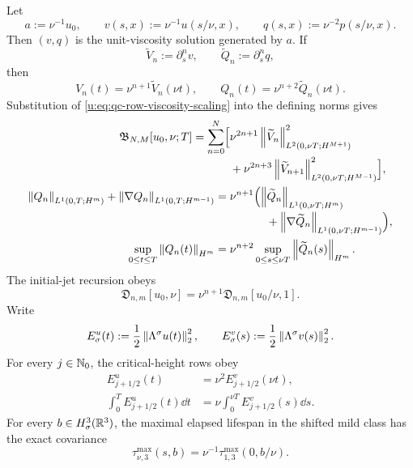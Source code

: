 \begin{proposition}
\label{u:prop:qc-exact-viscosity-scaling}
Let
\[
 a:=\nu^{-1}u_0,
 \qquad
 v(s,x):=\nu^{-1}u(s/\nu,x),
 \qquad
 q(s,x):=\nu^{-2}p(s/\nu,x).
\]
Then \((v,q)\) is the unit-viscosity solution generated by \(a\).  If
\[
 \widetilde V_n:=\partial_s^nv,
 \qquad
 \widetilde Q_n:=\partial_s^nq,
\]
then
\begin{equation}
 V_n(t)=\nu^{n+1}\widetilde V_n(\nu t),
 \qquad
 Q_n(t)=\nu^{n+2}\widetilde Q_n(\nu t).
 \label{u:eq:qc-row-viscosity-scaling}
\end{equation}
Substitution of \eqref{u:eq:qc-row-viscosity-scaling} into the defining norms gives
\begin{align}
 \mathfrak B_{N,M}[u_0,\nu;T]
 =\sum_{n=0}^{N}\Bigl[{}
 &\nu^{2n+1}
 \left\lVert \widetilde V_n\right\rVert_{L^2(0,\nu T;H^{M+1})}^2
 \notag\\[-2pt]
 &+\nu^{2n+3}
 \left\lVert \widetilde V_{n+1}\right\rVert_{L^2(0,\nu T;H^{M-1})}^2
 \Bigr],
 \label{u:eq:qc-rectangle-viscosity-scaling}\\
 \left\lVert Q_n\right\rVert_{L^1(0,T;H^m)}
 +\left\lVert \nabla Q_n\right\rVert_{L^1(0,T;H^{m-1})}
 ={}&\nu^{n+1}\Bigl(
 \left\lVert \widetilde Q_n\right\rVert_{L^1(0,\nu T;H^m)}
 \notag\\[-2pt]
 &\hspace{32pt}+
 \left\lVert \nabla\widetilde Q_n\right\rVert_{L^1(0,\nu T;H^{m-1})}
 \Bigr),
 \label{u:eq:qc-pressure-viscosity-scaling}\\
 \sup_{0\le t\le T}\left\lVert Q_n(t)\right\rVert_{H^m}
 ={}&\nu^{n+2}
 \sup_{0\le s\le\nu T}\left\lVert \widetilde Q_n(s)\right\rVert_{H^m}.
 \label{u:eq:qc-pressure-sup-viscosity-scaling}
\end{align}
The initial-jet recursion obeys
\begin{equation}
 \mathfrak D_{n,m}[u_0,\nu]
 =\nu^{n+1}\mathfrak D_{n,m}[u_0/\nu,1].
 \label{u:eq:qc-initial-jet-viscosity-scaling}
\end{equation}
Write
\[
 E_\sigma^u(t):=\frac12\left\lVert \Lambda^\sigma u(t)\right\rVert_2^2,
 \qquad
 E_\sigma^v(s):=\frac12\left\lVert \Lambda^\sigma v(s)\right\rVert_2^2.
\]
For every \(j\in\mathbb N_0\), the critical-height rows obey
\begin{align}
 E_{j+1/2}^u(t)
 &=\nu^2E_{j+1/2}^v(\nu t),
 \label{u:eq:qc-critical-height-viscosity-scaling}\\
 \int_0^T E_{j+1/2}^u(t)\dd t
 &=\nu\int_0^{\nu T}E_{j+1/2}^v(s)\dd s.
 \label{u:eq:qc-critical-height-mass-viscosity-scaling}
\end{align}
For every \(b\in H^3_\sigma(\mathbb R^3)\), the maximal elapsed lifespan in the
shifted mild class has the exact covariance
\begin{equation}
 \tau_{\nu,3}^{\max}(s,b)
 =\nu^{-1}\tau_{1,3}^{\max}(0,b/\nu).
 \label{u:eq:qc-maximal-lifespan-viscosity-scaling}
\end{equation}
\end{proposition}

